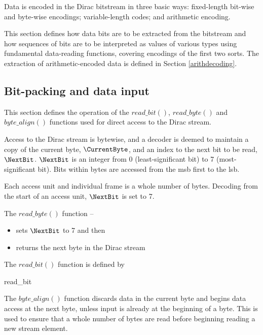 
Data is encoded in the Dirac bitstream in three basic ways: fixed-length
bit-wise and byte-wise encodings; variable-length codes; and arithmetic encoding.

This section defines how data bits are to be extracted from the bitstream and how
sequences of bits are to be interpreted as values of various types using fundamental
data-reading functions, covering encodings of the first two sorts. The extraction
of arithmetic-encoded data is defined in Section \ref{arithdecoding}.

\subsection{Bit-packing and data input}
\label{bitpacking}

This section defines the operation of the $read\_bit()$, $read\_byte()$ 
and $byte\_align()$ functions used for direct access to the Dirac stream.

Access to the Dirac stream is bytewise, and a decoder is deemed to maintain
a copy of the current byte, $\CurrentByte$, and an index to the next bit
to be read, $\NextBit$. $\NextBit$ is an integer from 0 (least-significant bit) to 7 
(most-significant bit). Bits within bytes are accessed from the msb first to the
lsb.

Each access unit and individual frame is a whole number of bytes. Decoding from the
start of an access unit, $\NextBit$ is set to 7.

The $read\_byte()$ function --
\begin{itemize}
\item sets $\NextBit$ to 7 and then
\item returns the next byte in the Dirac stream
\end{itemize}

The $read\_bit()$ function is defined by

\begin{pseudo}{read\_bit}{}
\bsEND
{}
\end{pseudo}

The $byte\_align()$ function discards data in the current byte and begins data access
at the next byte, unless input is already at the beginning of a byte. This is used to 
ensure that a whole number of bytes are read before
beginning reading a new stream element.

